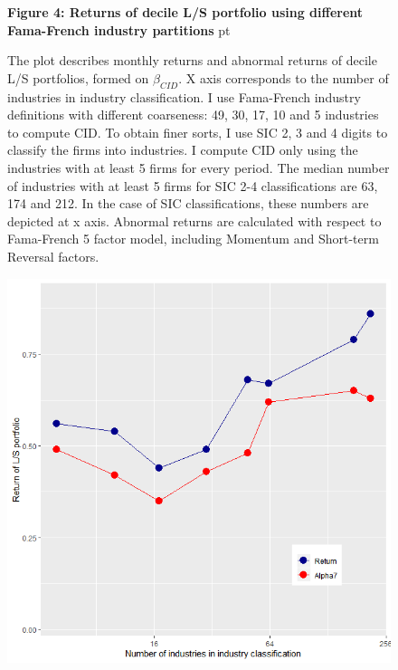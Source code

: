 \documentclass[12pt]{article}
\begin{document}
\begin{figure}
\textbf{Figure 4: Returns of decile L/S portfolio using different Fama-French industry partitions}
 pt
\begin{flushleft}
{The plot describes monthly returns and abnormal returns of decile L/S portfolios, formed on $\beta_{CID}$. X axis corresponds to the number of industries in industry classification. I use Fama-French industry definitions with different coarseness: 49, 30, 17, 10 and 5 industries to compute CID. To obtain finer sorts, I use SIC 2, 3 and 4 digits to classify the firms into industries. I compute CID only using the industries with at least 5 firms for every period. The median number of industries with at least 5 firms for SIC 2-4 classifications are 63, 174 and 212. In the case of SIC classifications, these numbers are depicted at x axis.  Abnormal returns are calculated with respect to Fama-French 5 factor model, including Momentum and Short-term Reversal factors.}
\end{flushleft}
\centering
\includegraphics[width=1\textwidth]{paper_b3/Figure4.png}
\end{figure}


\clearpage
\end{document}
